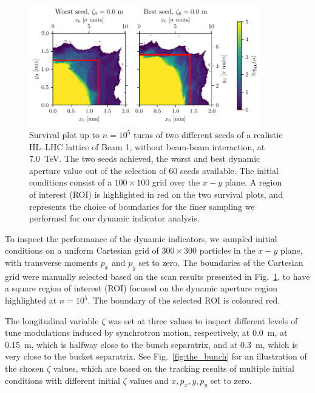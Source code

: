 \begin{figure}[th]
    \centering
    \includegraphics[width=0.9\textwidth]{6_lhc_dynamic_indicators/figs/updated/quick_scan.pdf}
    \caption{Survival plot up to $n=10^5$ turns of two different seeds of a realistic HL--LHC lattice of Beam 1, without beam-beam interaction, at \SI{7.0}{TeV}. The two seeds achieved, the worst and best dynamic aperture value out of the selection of 60 seeds available. The initial conditions consist of a $100\times100$ grid over the $x-y$ plane. A region of interest (ROI) is highlighted in red on the two survival plots, and represents the choice of boundaries for the finer sampling we performed for our dynamic indicator analysis.}
    \label{fig:seed_presentation}
\end{figure}

To inspect the performance of the dynamic indicators, we sampled initial conditions on a uniform Cartesian grid of $300\times300$ particles in the $x-y$ plane, with transverse moments $p_x$ and $p_y$ set to zero. The boundaries of the Cartesian grid were manually selected based on the scan results presented in Fig.~\ref{fig:seed_presentation}, to have a square region of interest (ROI) focused on the dynamic aperture region highlighted at $n=10^5$. The boundary of the selected ROI is coloured red.

The longitudinal variable $\zeta$ was set at three values to inspect different levels of tune modulations induced by synchrotron motion, respectively, at \SI{0.0}{\meter}, at \SI{0.15}{\meter}, which is halfway close to the bunch separatrix, and at \SI{0.3}{\meter}, which is very close to the bucket separatrix. See Fig.~\ref{fig:the_bunch} for an illustration of the chosen $\zeta$ values, which are based on the tracking results of multiple initial conditions with different initial $\zeta$ values and $x, p_x, y, p_y$ set to zero. 

